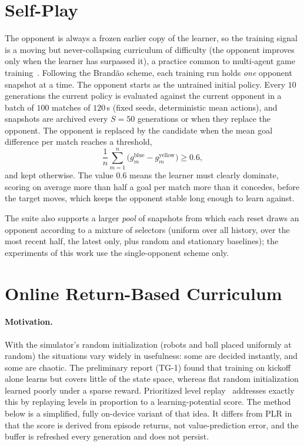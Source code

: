 \section{Self-Play}
\label{sec:selfplay}

The opponent is always a frozen earlier copy of the learner, so the training signal is a moving
but never-collapsing curriculum of difficulty (the opponent improves only when the learner has surpassed it),
a practice common to multi-agent game training~\cite{silver2017mastering,berner2019dota}.
Following the Brand\~ao scheme, each training run holds \emph{one} opponent snapshot at a time.  The opponent starts as the
untrained initial policy.  Every $10$ generations the current policy is evaluated against the current
opponent in a batch of $100$ matches of $120$\,s (fixed seeds, deterministic mean actions), and snapshots are archived every $S=50$ generations or when they replace the opponent.  The opponent is replaced by the
candidate when the mean goal difference per match reaches a threshold,
\begin{equation}
    \frac{1}{n}\sum_{m=1}^{n}\big(g^{\text{blue}}_m - g^{\text{yellow}}_m\big) \ge 0.6 ,
\end{equation}
and kept otherwise.  The value $0.6$ means the learner must clearly dominate, scoring on average more than half a goal per match more than it concedes, before the target moves, which keeps the opponent stable long enough to learn against.

The suite also supports a larger \emph{pool} of snapshots from which each reset draws an opponent according to a mixture of
selectors (uniform over all history, over the most recent half, the latest only, plus random and stationary baselines); the experiments of this work use the single-opponent scheme only.

\section{Online Return-Based Curriculum}
\label{sec:curriculum}

\paragraph{Motivation.}
With the simulator's random initialization (robots and ball placed uniformly at random) the situations vary widely in
usefulness: some are decided instantly, and some are chaotic.  The preliminary report (TG-1) found that training on kickoff alone learns but covers little of the state
space, whereas flat random initialization learned poorly under a sparse reward.  Prioritized level
replay~\cite{prioritized_level_replay} addresses exactly this by replaying levels in proportion to a learning-potential score.
The method below is a simplified, fully on-device variant of that idea.  It differs from PLR in that the score is derived from episode returns, not value-prediction error,
and the buffer is refreshed every generation and does not persist.

